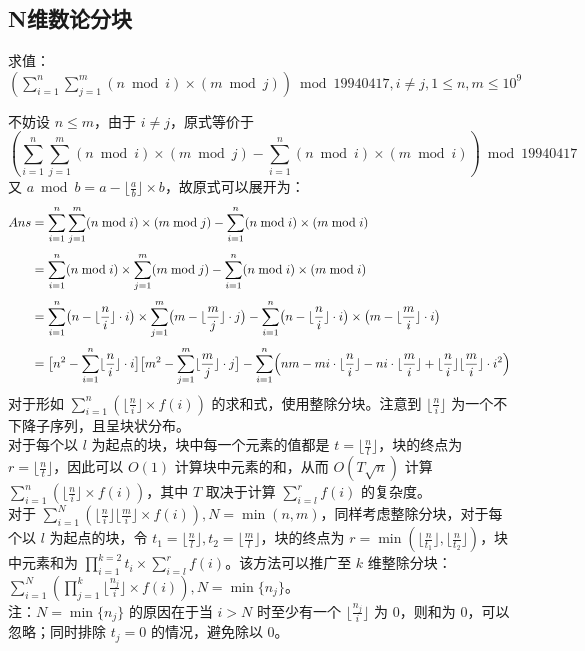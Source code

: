 \documentclass[12pt,a4paper]{article}
\begin{document}
\subsection{N维数论分块}
\begin{mdframed}[leftline=true, linewidth=2pt, linecolor=gray]
	求值：$\displaystyle(\sum_{i=1}^{n} \sum_{j=1}^{m} (n \bmod i) \times (m \bmod j))\bmod{19940417},i \neq j,1 \leq n,m \leq 10^9$
\end{mdframed}
不妨设 $n\le m$，由于 $i\ne j$，原式等价于 \begin{equation*}
	\displaystyle(\sum_{i=1}^{n} \sum_{j=1}^{m} (n \bmod i) \times (m \bmod j)-\sum_{i=1}^{n}(n \bmod i) \times (m \bmod i))\bmod{19940417}
\end{equation*}
又 $\displaystyle a\bmod b=a-\lfloor\frac{a}{b}\rfloor\times b$，故原式可以展开为：
\begin{align*}
	\displaystyle Ans &= 
	\sum_{i=1}^{n} \sum_{j=1}^{m} (n \bmod i) \times (m \bmod j)
	- \sum_{i=1}^{n} (n \bmod i) \times (m \bmod i) \\[1mm]
	&= \sum_{i=1}^{n} (n \bmod i) \times \sum_{j=1}^{m} (m \bmod j)
	- \sum_{i=1}^{n} (n \bmod i) \times (m \bmod i) \\[1mm]
	&= \sum_{i=1}^{n} \bigl(n - \lfloor \frac{n}{i} \rfloor \cdot i \bigr)
	\times \sum_{j=1}^{m} \bigl(m - \lfloor \frac{m}{j} \rfloor \cdot j \bigr)
	- \sum_{i=1}^{n} \bigl(n - \lfloor \frac{n}{i} \rfloor \cdot i \bigr)
	\times \bigl(m - \lfloor \frac{m}{i} \rfloor \cdot i \bigr) \\[1mm]
	&= \bigl[n^2 - \sum_{i=1}^{n} \lfloor \frac{n}{i} \rfloor \cdot i \bigr]
	\bigl[m^2 - \sum_{j=1}^{m} \lfloor \frac{m}{j} \rfloor \cdot j \bigr] 
	- \sum_{i=1}^{n} \Bigl(nm - m i \cdot \lfloor \frac{n}{i} \rfloor - n i \cdot \lfloor \frac{m}{i} \rfloor + \lfloor \frac{n}{i} \rfloor \lfloor \frac{m}{i} \rfloor \cdot i^2 \Bigr)
\end{align*}
对于形如 $\displaystyle \sum_{i=1}^{n}(\lfloor\frac{n}{i}\rfloor\times f(i))$ 的求和式，使用整除分块。注意到 $\displaystyle\lfloor\frac{n}{i}\rfloor$ 为一个不下降子序列，且呈块状分布。\\
对于每个以 $l$ 为起点的块，块中每一个元素的值都是 $\displaystyle t=\lfloor\frac{n}{l}\rfloor$，块的终点为 $\displaystyle r=\lfloor\frac{n}{t}\rfloor$，因此可以 $O(1)$ 计算块中元素的和，从而 $O(T\sqrt{n})$ 计算 $\displaystyle\sum_{i=1}^{n}(\lfloor\frac{n}{i}\rfloor\times f(i))$，其中 $T$ 取决于计算 $\displaystyle \sum_{i=l}^{r}f(i)$ 的复杂度。\\
对于 $\displaystyle \sum_{i=1}^{N}(\lfloor\frac{n}{i}\rfloor\lfloor\frac{m}{i}\rfloor\times f(i)),N=\min(n,m)$，同样考虑整除分块，对于每个以 $l$ 为起点的块，令 $\displaystyle t_1=\lfloor\frac{n}{l}\rfloor,t_2=\lfloor\frac{m}{l}\rfloor$，块的终点为 $\displaystyle r=\min(\lfloor\frac{n}{t_1}\rfloor,\lfloor\frac{n}{t_2}\rfloor)$，块中元素和为 $\displaystyle \prod_{i=1}^{k=2}t_i\times \sum_{i=l}^{r}f(i)$。该方法可以推广至 $k$ 维整除分块：$\displaystyle \sum_{i=1}^{N}(\prod_{j=1}^{k}\lfloor\frac{n_j}{i}\rfloor\times f(i)),N=\min\{n_j\}$。\\
注：$N=\min\{n_j\}$ 的原因在于当 $i>N$ 时至少有一个 $\displaystyle\lfloor\frac{n_j}{i}\rfloor$ 为 $0$，则和为 $0$，可以忽略；同时排除 $t_j=0$ 的情况，避免除以 $0$。
\end{document}

